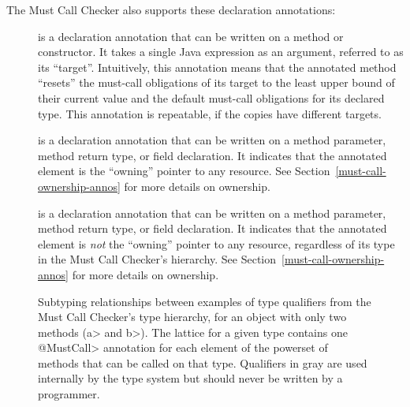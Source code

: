 The Must Call Checker also supports these declaration annotations:

\begin{description}

\item[]
  is a declaration annotation that can be written on a method or constructor. It takes a single Java expression as an
  argument, referred to as its ``target''. Intuitively, this annotation means that the annotated method
  ``resets'' the must-call obligations of its target to the least upper bound of their current value and the default
  must-call obligations for its declared type. This annotation is repeatable, if the copies have different targets.


\item[]
  is a declaration annotation that can be written on a method parameter, method return type, or
  field declaration. It indicates that the annotated element is the ``owning'' pointer to any resource.
  See Section~\ref{must-call-ownership-annos} for more details on ownership.

\item[]
  is a declaration annotation that can be written on a method parameter, method return type, or
  field declaration. It indicates that the annotated element is \emph{not} the ``owning'' pointer to any resource,
  regardless of its type in the Must Call Checker's hierarchy.
  See Section~\ref{must-call-ownership-annos} for more details on ownership.


\end{description}

\begin{figure}
\caption{Subtyping relationships between examples of type qualifiers from the Must Call Checker's type
hierarchy, for an object with only two methods (\<a> and \<b>).
The lattice for a given type contains one \<@MustCall> annotation for each element of the powerset
of methods that can be called on that type.
Qualifiers in gray are used internally by the type system but should
never be written by a programmer.}
\label{fig-must-call-hierarchy}
\end{figure}

